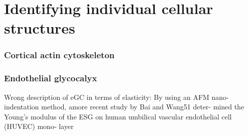 \part{Identifying individual cellular structures}

\section{Cortical actin cytoskeleton}

\section{Endothelial glycocalyx}

Wrong description of eGC in terms of elasticity:
By using an AFM nano-indentation method, amore recent study by Bai and Wang51 deter- mined the Young’s modulus of the ESG on human umbilical vascular endothelial cell (HUVEC) mono- layer \cite{Fu2013}